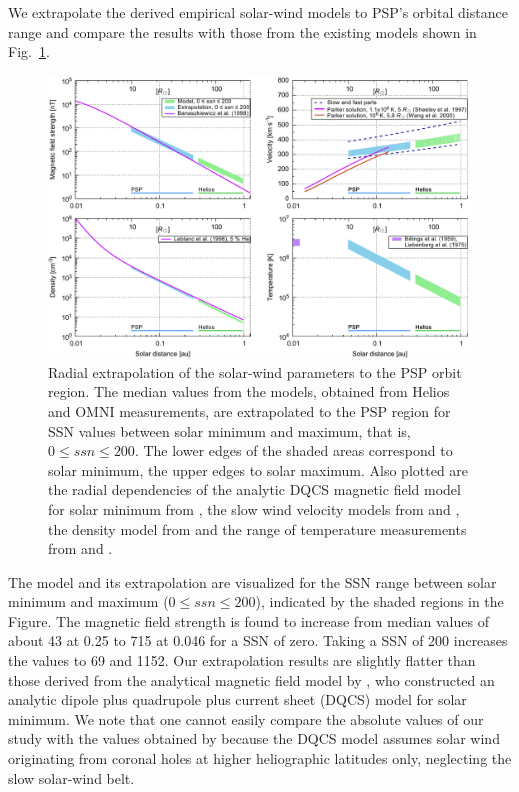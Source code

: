 \documentclass[]{aa}
\begin{document}
        We extrapolate the derived empirical solar-wind models to PSP’s orbital distance range and compare the results with those from the existing models shown in Fig.~\ref{fig:sw_extrapolation_ssn_f_plot}.
        \begin{figure}
                \includegraphics[width=18cm]{sw_extrapolation_ssn_f_plot.pdf}
                \caption{Radial extrapolation of the solar-wind parameters to the PSP orbit region. The median values from the models, obtained from Helios and OMNI measurements, are extrapolated to the PSP region for SSN values between solar minimum and maximum, that is, $0 \le ssn \le 200$. The lower edges of the shaded areas correspond to solar minimum, the upper edges to solar maximum. Also plotted are the radial dependencies of the analytic DQCS magnetic field model for solar minimum from \citet{Banaszkiewicz1998}, the slow wind velocity models from \citet{Sheeley1997} and \citet{Wang2000}, the density model from \citet{Leblanc1998} and the range of temperature measurements from \citet{Billings1959} and \citet{Liebenberg1975}.}
                \label{fig:sw_extrapolation_ssn_f_plot}
        \end{figure}
        The model and its extrapolation are visualized for the SSN range between solar minimum and maximum ($0 \le ssn \le 200$), indicated by the shaded regions in the Figure.
        The magnetic field strength is found to increase from median values of about \SI{43}{\nT} at \SI{0.25}{\au} to \SI{715}{\nT} at \SI{0.046}{\au} for a SSN of zero. Taking a SSN of 200 increases the values to \SI{69}{\nT} and \SI{1152}{\nT}. Our extrapolation results are slightly flatter than those derived from the analytical magnetic field model by \citet{Banaszkiewicz1998}, who constructed an analytic dipole plus quadrupole plus current sheet (DQCS) model for solar minimum. We note that one cannot easily compare the absolute values of our study with the values obtained by \citet{Banaszkiewicz1998} because the DQCS model assumes solar wind originating from coronal holes at higher heliographic latitudes only, neglecting the slow solar-wind belt.
\end{document}
